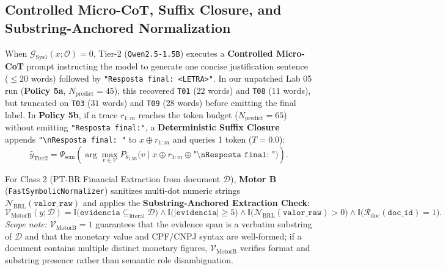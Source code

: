 \documentclass[10pt,a4paper]{article}
\begin{document}
\subsection{Controlled Micro-CoT, Suffix Closure, and Substring-Anchored Normalization}
\label{sec:math_microcot}

When $\mathcal{G}_{\text{Sys1}}(x; \mathcal{O}) = 0$, Tier-2 (\texttt{Qwen2.5-1.5B}) executes a \textbf{Controlled Micro-CoT} prompt instructing the model to generate one concise justification sentence ($\le 20$ words) followed by \texttt{"Resposta final: <LETRA>"}. In our unpatched Lab 05 run (\textbf{Policy 5a}, $N_{\text{predict}} = 45$), this recovered \texttt{T01} ($22$ words) and \texttt{T08} ($11$ words), but truncated on \texttt{T03} ($31$ words) and \texttt{T09} ($28$ words) before emitting the final label. In \textbf{Policy 5b}, if a trace $r_{1:m}$ reaches the token budget ($N_{\text{predict}} = 65$) without emitting \texttt{"Resposta final:"}, a \textbf{Deterministic Suffix Closure} appends \texttt{"\textbackslash nResposta final: "} to $x \oplus r_{1:m}$ and queries 1 token ($T=0.0$):
\begin{equation}
\label{eq:suffix_closure}
\hat{y}_{\text{Tier2}} = \Psi_{\text{sem}}\!\left(\arg\max_{v \in \mathcal{V}} P_{\theta_{\text{1.5B}}}\big(v \;\big|\; x \oplus r_{1:m} \oplus \texttt{"\textbackslash nResposta final: "}\big)\right).
\end{equation}

For Class 2 (PT-BR Financial Extraction from document $\mathcal{D}$), \textbf{Motor B} (\texttt{FastSymbolicNormalizer}) sanitizes multi-dot numeric strings $\mathcal{N}_{\text{BRL}}(\texttt{valor\_raw})$ and applies the \textbf{Substring-Anchored Extraction Check}:
\begin{equation}
\label{eq:symbolic_proof}
\mathcal{V}_{\text{MotorB}}(y; \mathcal{D}) = \mathbb{I}\big(\texttt{evidencia} \subseteq_{\text{literal}} \mathcal{D}\big) \land \mathbb{I}\big(|\texttt{evidencia}| \ge 5\big) \land \mathbb{I}\big(\mathcal{N}_{\text{BRL}}(\texttt{valor\_raw}) > 0\big) \land \mathbb{I}\big(\mathcal{R}_{\text{doc}}(\texttt{doc\_id}) = 1\big).
\end{equation}
\emph{Scope note:} $\mathcal{V}_{\text{MotorB}} = 1$ guarantees that the evidence span is a verbatim substring of $\mathcal{D}$ and that the monetary value and CPF/CNPJ syntax are well-formed; if a document contains multiple distinct monetary figures, $\mathcal{V}_{\text{MotorB}}$ verifies format and substring presence rather than semantic role disambiguation.
\end{document}
